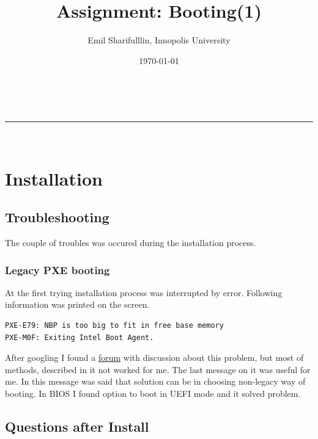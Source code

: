 \documentclass[a4paper,11pt]{article}
\makeatletter
\renewcommand*\sfdefault{phv}
\newcommand*{\TitleFont}{%
      \usefont{\encodingdefault}{\sfdefault}{b}{n}%
      \fontsize{20}{22}%
      \selectfont}
\newcommand{\linia}{\rule{\linewidth}{0.5pt}}
\theoremstyle{mytheor}
\renewcommand{\maketitle}{
\begin{center}
\vspace{2ex}
{\huge \textsc{\@title}}
\vspace{1ex}
\\
\linia\\
\@author \hfill \@date
\vspace{4ex}
\end{center}
}
\makeatother
\begin{document}
\title{\TitleFont Assignment: Booting(1) }

\author{Emil Sharifulllin, Innopolis University}

\date{\today}

\maketitle

\section{Installation}

\subsection{Troubleshooting}
The couple of troubles was occured during the installation process.

\subsubsection{Legacy PXE booting}
At the first trying installation process was interrupted by error. Following information was printed on the screen.

\begin{lstlisting}
PXE-E79: NBP is too big to fit in free base memory
PXE-M0F: Exiting Intel Boot Agent.
\end{lstlisting}
After googling I found a \href{https://social.technet.microsoft.com/Forums/windows/en-US/dc31331e-605d-420a-b827-9bfb745de633/pxee79-nbp-is-too-big-to-fit-in-free-base-memory?forum=winserversetup}{forum} with discussion about this problem, but most of methods, described in it not worked for me. The last message on it was useful for me. In this message was said that solution can be in choosing non-legacy way of booting. In BIOS I found option to boot in UEFI mode and it solved problem.

\subsection{Questions after Install}
\subsubsection{}
\end{document}
